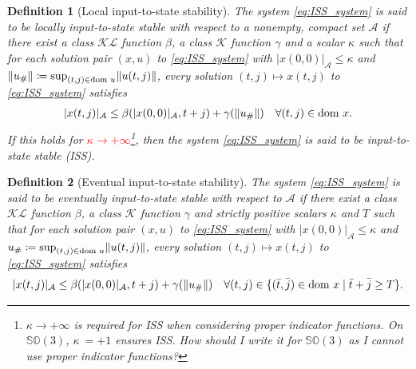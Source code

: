 \documentclass{article}
\DeclarePairedDelimiter{\norm}{\lVert}{\rVert}
\newcommand{\dom}{\text{dom }}
\newcommand{\SOthree}{\mathbb{SO}(3)}
\newtheorem{definition}{Definition}
\begin{document}
\begin{definition}[{Local input-to-state stability}]
    The system  \eqref{eq:ISS_system} is said to be locally input-to-state stable with respect to a nonempty, compact set $\mathcal{A}$ if there exist a class $\mathcal{KL}$ function $\beta$, a class $\mathcal{K}$ function $\gamma$ and a scalar $\kappa$ such that for each solution pair $(x,u)$ to \eqref{eq:ISS_system} with $|{x(0,0)}|_\mathcal{A}\leq \kappa$ and  $\norm{u_{\#}}\coloneqq  \sup_{(t,j)\in \dom u} \norm{u(t,j)}$, every solution $(t,j)\mapsto x(t,j)$ to \eqref{eq:ISS_system} satisfies
    \begin{align*}
        |x(t,j)|_\mathcal{A}\leq \beta(|x(0,0)|_\mathcal{A}, t+j) + \gamma(\norm{u_{\#}}) \quad \forall (t,j)\in \dom x.
    \end{align*}
    If this holds for \textcolor{red}{$\kappa \to +\infty$}\footnote{$\kappa\to+\infty$ is required for ISS when considering proper indicator functions. On $\SOthree$, $\kappa\ = +1$ ensures ISS. How should I write it for $\SOthree$ as I cannot use proper indicator functions?}, then the system \eqref{eq:ISS_system} is said to be input-to-state stable (ISS). 
\end{definition}

\begin{definition}[{Eventual input-to-state stability}]
    The system  \eqref{eq:ISS_system} is said to be eventually input-to-state stable with respect to $\mathcal{A}$ if there exist a class $\mathcal{KL}$ function $\beta$, a class $\mathcal{K}$ function $\gamma$ and strictly positive scalars $\kappa$ and $T$ such that for each solution pair $(x,u)$ to \eqref{eq:ISS_system} with $|{x(0,0)}|_\mathcal{A}\leq \kappa$ and  $u_{\#}\coloneqq \sup_{(t,j)\in \dom u} \norm{u(t,j)}$, every solution $(t,j)\mapsto x(t,j)$ to \eqref{eq:ISS_system} satisfies
    \begin{align*}
        |x(t,j)|_\mathcal{A}\leq \beta(|x(0,0)|_\mathcal{A}, t+j) + \gamma(\norm{u_{\#}}) \quad \forall (t,j) \in  \{(\bar t,\bar j)\in \dom x \mid \bar t+\bar j \geq T\}.
    \end{align*}
\end{definition}
\end{document}
